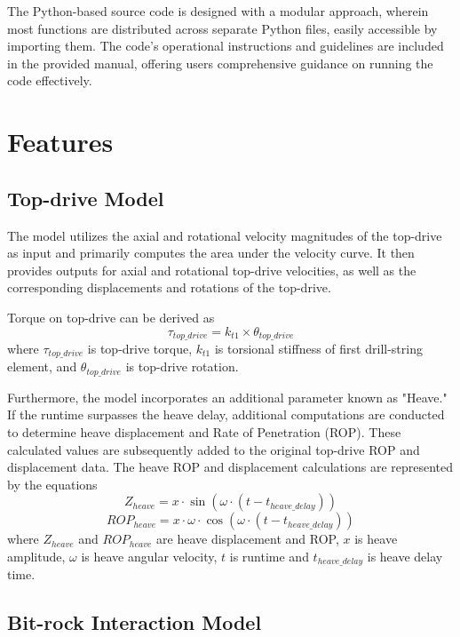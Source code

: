 The Python-based source code is designed with a modular approach, wherein most functions are distributed across separate Python files, easily accessible by importing them. The code's operational instructions and guidelines are included in the provided manual, offering users comprehensive guidance on running the code effectively.

\section{Features}
\subsection{Top-drive Model}

The model utilizes the axial and rotational velocity magnitudes of the top-drive as input and primarily computes the area under the velocity curve. It then provides outputs for axial and rotational top-drive velocities, as well as the corresponding displacements and rotations of the top-drive.

Torque on top-drive can be derived as
\begin{equation}\label{TorqueEQ}
  \tau_{top\_drive} = k_{t1} \times \theta_{top\_drive}
\end{equation}
where 
$\tau_{top\_drive}$ is top-drive torque, $k_{t1}$ is torsional stiffness of first drill-string element, and $\theta_{top\_drive}$ is top-drive rotation.

Furthermore, the model incorporates an additional parameter known as "Heave." If the runtime surpasses the heave delay, additional computations are conducted to determine heave displacement and Rate of Penetration (ROP). These calculated values are subsequently added to the original top-drive ROP and displacement data. The heave ROP and displacement calculations are represented by the equations
\begin{equation}\label{Z_heave}
  Z_{heave} = x \cdot \sin(\omega \cdot (t - t_{heave\_delay}))
\end{equation}
\begin{equation}\label{ROP_heave}
  ROP_{heave} = x \cdot \omega \cdot \cos(\omega \cdot (t - t_{heave\_delay}))
\end{equation}
where 
$Z_{heave}$ and $ROP_{heave}$ are heave displacement and ROP, $x$ is heave amplitude, $\omega$ is heave angular velocity, $t$ is runtime and $t_{heave\_delay}$ is heave delay time.
 
\subsection{Bit-rock Interaction Model}

